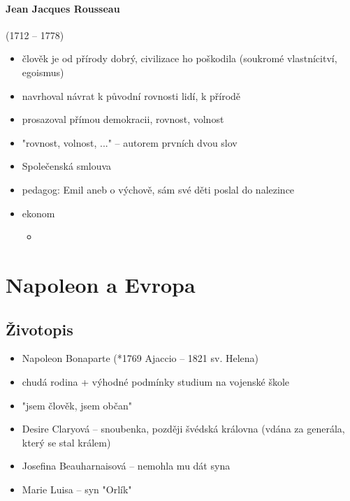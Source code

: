 \paragraph{Jean Jacques Rousseau} (1712 -- 1778)
\begin{itemize}
\item člověk je od přírody dobrý, civilizace ho poškodila  (soukromé vlastnícitví, egoismus)
\item navrhoval návrat k původní rovnosti lidí, k přírodě
\item prosazoval přímou demokracii, rovnost, volnost
\item "rovnost, volnost, ..." -- autorem prvních dvou slov
\item Společenská smlouva
\item pedagog: Emil aneb o výchově, sám své děti poslal do nalezince
\item ekonom
	\begin{itemize}
	\item
	\end{itemize}
\end{itemize}


\section{Napoleon a Evropa}
\subsection{Životopis}
\begin{itemize}
\item Napoleon Bonaparte (*1769 Ajaccio -- 1821 sv. Helena)
\item chudá rodina + výhodné podmínky \ra studium na vojenské škole
\item "jsem člověk, jsem občan"
\item Desire Claryová -- snoubenka, později švédská královna (vdána za generála, který se stal králem)
\item Josefina Beauharnaisová -- nemohla mu dát syna
\item Marie Luisa -- syn "Orlík"
\end{itemize}

